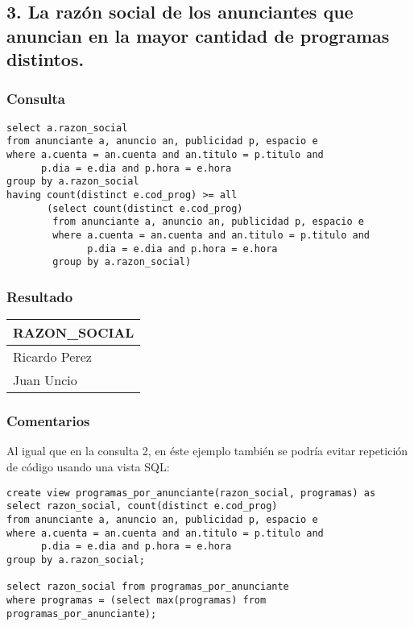 \subsection*{3. \normalsize{La raz\'on social de los anunciantes que anuncian en la mayor cantidad de programas distintos.}}

\subsubsection*{Consulta}
\begin{lstlisting} 
select a.razon_social
from anunciante a, anuncio an, publicidad p, espacio e
where a.cuenta = an.cuenta and an.titulo = p.titulo and 
      p.dia = e.dia and p.hora = e.hora
group by a.razon_social
having count(distinct e.cod_prog) >= all 
       (select count(distinct e.cod_prog)
        from anunciante a, anuncio an, publicidad p, espacio e
        where a.cuenta = an.cuenta and an.titulo = p.titulo and 
              p.dia = e.dia and p.hora = e.hora
        group by a.razon_social)
\end{lstlisting}

\subsubsection*{Resultado}
\begin{tabular}{|l|}
  \hline
    \bf{RAZON\_SOCIAL} \\ 
  \hline
    Ricardo Perez \\
    Juan Uncio \\ 
  \hline
\end{tabular} 

\subsubsection*{Comentarios}
Al igual que en la consulta 2, en \'este ejemplo tambi\'en se podr\'ia evitar repetici\'on de c\'odigo usando una vista SQL:

\begin{lstlisting} 
create view programas_por_anunciante(razon_social, programas) as
select razon_social, count(distinct e.cod_prog)
from anunciante a, anuncio an, publicidad p, espacio e
where a.cuenta = an.cuenta and an.titulo = p.titulo and 
      p.dia = e.dia and p.hora = e.hora
group by a.razon_social;

select razon_social from programas_por_anunciante
where programas = (select max(programas) from programas_por_anunciante);
\end{lstlisting}

